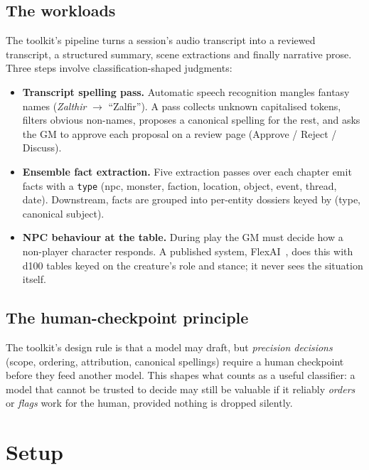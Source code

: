 \documentclass[11pt]{article}
\begin{document}
\subsection{The workloads}
The toolkit's pipeline turns a session's audio transcript into a reviewed transcript, a structured
summary, scene extractions and finally narrative prose. Three steps involve classification-shaped
judgments:
\begin{itemize}
  \item \textbf{Transcript spelling pass.} Automatic speech recognition mangles fantasy names
        (\emph{Zalthir} $\rightarrow$ ``Zalfir''). A pass collects unknown capitalised tokens,
        filters obvious non-names, proposes a canonical spelling for the rest, and asks the GM to
        approve each proposal on a review page (Approve / Reject / Discuss).
  \item \textbf{Ensemble fact extraction.} Five extraction passes over each chapter emit facts with a
        \texttt{type} (npc, monster, faction, location, object, event, thread, date). Downstream,
        facts are grouped into per-entity dossiers keyed by (type, canonical subject).
  \item \textbf{NPC behaviour at the table.} During play the GM must decide how a non-player character
        responds. A published system, FlexAI~\cite{flexai}, does this with d100 tables keyed on the
        creature's role and stance; it never sees the situation itself.
\end{itemize}

\subsection{The human-checkpoint principle}
The toolkit's design rule is that a model may draft, but \emph{precision decisions} (scope,
ordering, attribution, canonical spellings) require a human checkpoint before they feed another
model. This shapes what counts as a useful classifier: a model that cannot be trusted to decide may
still be valuable if it reliably \emph{orders} or \emph{flags} work for the human, provided nothing is
dropped silently.

\section{Setup}
\end{document}
